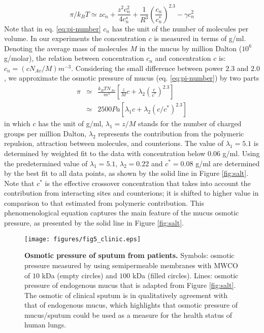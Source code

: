 \documentclass[8.5pt,twoside,twocolumn]{article}
\begin{document}
\begin{equation}
\pi /k_{B}T\simeq zc_{n}+\frac{z^{2}c_{n}^{2}}{4c_{n}^{s}}+\frac{1}{R^{3}}%
\left( \frac{c_{n}}{c_{n}^{\ast }}\right) ^{2.3}-\gamma c_{n}^{2}
\label{eq:pi-number}
\end{equation}%
Note that in eq. \ref{eq:pi-number} $c_{n}$ has the unit of the number of
molecules per volume. In our experiments the concentration $c$ is measured
in terms of g/ml. Denoting the average mass of molecules $M$ in the mucus by
million Dalton ($10^{6}$ g/molar), the relation between concentration $c_{n}$
and concentration $c$ is: $c_{n}=\left( cN_{Av}/M\right) \unit{m}^{-3}$.
Considering the small difference between power $2.3$ and $2.0$, we
approximate the osmotic pressure of mucus (eq. \ref{eq:pi-number}) by two
parts%
\begin{eqnarray}
\pi &\simeq &\frac{k_{B}TN_{Av}}{m^{3}}\left[ \frac{z}{M}c+\lambda
_{2}\left( \frac{c}{c^{\ast }}\right) ^{2.3}\right]  \nonumber \\
&\simeq &2500Pa\left[ \lambda _{1}c+\lambda _{2}\left( c/c^{\ast }\right)
^{2.3}\right]  \label{eq:pi_mucus-conc}
\end{eqnarray}%
in which $c$ has the unit of g/ml, $\lambda _{1}=z/M$ stands for the number
of charged groups per million Dalton, $\lambda _{2}$ represents the
contribution from the polymeric repulsion, attraction between molecules, and
counterions. The value of $\lambda _{1}=5.1$ is determined by weighted fit
to the data with concentration below $0.06$ g/ml. Using the predetermined
value of $\lambda _{1}=5.1$, $\lambda _{2}=0.22$ and $c^{\ast }=0.08$ g/ml
are determined by the best fit to all data points, as shown by the solid
line in Figure \ref{fig:salt}. Note that $c^{\ast }$ is the effective
crossover concentration that takes into account the contribution from
interacting sites and counterions; it is shifted to higher value in
comparison to that estimated from polymeric contribution. This
phenomenological equation captures the main feature of the mucus osmotic
pressure, as presented by the solid line in Figure \ref{fig:salt}. 
\begin{figure}[h!]
\centering
\texttt{[image: figures/fig5\_clinic.eps]}
\caption{\textbf{Osmotic pressure of sputum from patients.} Symbols: osmotic
pressure measured by using semipermeable membranes with MWCO of $10$ kDa
(empty circles) and $100$ kDa (filled circles). Lines: osmotic pressure of
endogenous mucus that is adapted from Figure \protect\ref{fig:salt}. The
osmotic of clinical sputum is in qualitatively agreement with that of
endogenous mucus, which highlights that osmotic pressure of mucus/sputum
could be used as a measure for the health status of human lungs.}
\label{fig:clinic}
\end{figure}
\end{document}
